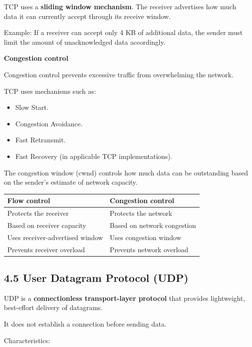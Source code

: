 TCP uses a \textbf{sliding window mechanism}. The receiver advertises how much data it can currently accept through its receive window.

Example: If a receiver can accept only 4 KB of additional data, the sender must limit the amount of unacknowledged data accordingly.

\textbf{Congestion control}

Congestion control prevents excessive traffic from overwhelming the network.

TCP uses mechanisms such as:

\begin{itemize}
    \item Slow Start.
    \item Congestion Avoidance.
    \item Fast Retransmit.
    \item Fast Recovery (in applicable TCP implementations).
\end{itemize}

The congestion window (cwnd) controls how much data can be outstanding based on the sender's estimate of network capacity.

\begin{table}[htbp]
\centering
\begin{tabularx}{\textwidth}{X X}
\toprule
\textbf{Flow control} & \textbf{Congestion control} \\
\midrule
Protects the receiver & Protects the network \\
Based on receiver capacity & Based on network congestion \\
Uses receiver-advertised window & Uses congestion window \\
Prevents receiver overload & Prevents network overload \\
\bottomrule
\end{tabularx}
\end{table}

\subsection{4.5 User Datagram Protocol (UDP)}

UDP is a \textbf{connectionless transport-layer protocol} that provides lightweight, best-effort delivery of datagrams.

It does not establish a connection before sending data.

Characteristics:

